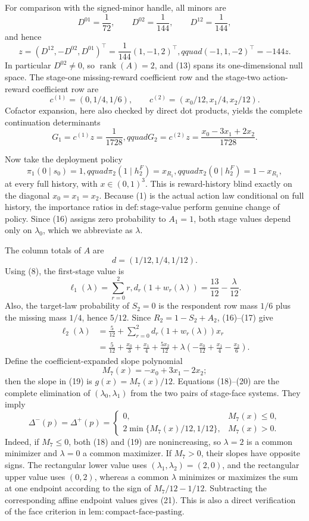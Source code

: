 For comparison with the signed-minor handle, all minors are
\[
D^{01}=\frac1{72},\qquad D^{02}=\frac1{144},\qquad
D^{12}=\frac1{144},
\tag{12}
\]
and hence
\[
z=(D^{12},-D^{02},D^{01})^\top
=\frac1{144}(1,-1,2)^\top,qquad
(-1,1,-2)^\top=-144z.
\tag{13}
\]
In particular \(D^{02}\ne0\), so \(\operatorname{rank}(A)=2\), and (13) spans its one-dimensional null space. The stage-one missing-reward coefficient row and the stage-two action-reward coefficient row are
\[
c^{(1)}=(0,1/4,1/6),
\qquad c^{(2)}=(x_0/12,x_1/4,x_2/12).
\tag{14}
\]
Cofactor expansion, here also checked by direct dot products, yields the complete continuation determinants
\[
G_1=c^{(1)}z=\frac1{1728},qquad
G_2=c^{(2)}z=\frac{x_0-3x_1+2x_2}{1728}.
\tag{15}
\]

Now take the deployment policy
\[
\pi_1(0\mid s_0)=1,qquad
\pi_2(1\mid h_2^F)=x_{R_1},qquad
\pi_2(0\mid h_2^F)=1-x_{R_1},
\tag{16}
\]
at every full history, with \(x\in(0,1)^3\). This is reward-history blind exactly on the diagonal \(x_0=x_1=x_2\). Because (1) is the actual action law conditional on full history, the importance ratios in \(\mathrm{def{:}stage\text{-}value}\) perform genuine change of policy. Since (16) assigns zero probability to \(A_1=1\), both stage values depend only on \(\lambda_0\), which we abbreviate as \(\lambda\).

The column totals of \(A\) are
\[
d=(1/12,1/4,1/12).
\tag{17}
\]
Using (8), the first-stage value is
\[
\ell_1(\lambda)=\sum_{r=0}^2r,d_r(1+w_r(\lambda))
=\frac{13}{12}-\frac{\lambda}{12}.
\tag{18}
\]
Also, the target-law probability of \(S_2=0\) is the respondent row mass \(1/6\) plus the missing mass \(1/4\), hence \(5/12\). Since \(R_2=1-S_2+A_2\), (16)--(17) give
\[
\begin{aligned}
\ell_2(\lambda)
&=\frac5{12}+\sum_{r=0}^2d_r(1+w_r(\lambda))x_r\\
&=\frac5{12}+\frac{x_0}{3}+\frac{x_1}{4}+\frac{5x_2}{12}
+\lambda\left(-\frac{x_0}{12}+\frac{x_1}{4}-\frac{x_2}{6}\right).
\end{aligned}
\tag{19}
\]
Define the coefficient-expanded slope polynomial
\[
M_7(x)=-x_0+3x_1-2x_2;
\tag{20}
\]
then the slope in (19) is \(g(x)=M_7(x)/12\). Equations (18)--(20) are the complete elimination of \((\lambda_0,\lambda_1)\) from the two pairs of stage-face systems. They imply
\[
\Delta^-(p)=\Delta^+(p)=
\begin{cases}
0,&M_7(x)\leq0,\\
2\min\{M_7(x)/12,1/12\},&M_7(x)>0.
\end{cases}
\tag{21}
\]
Indeed, if \(M_7\leq0\), both (18) and (19) are nonincreasing, so \(\lambda=2\) is a common minimizer and \(\lambda=0\) a common maximizer. If \(M_7>0\), their slopes have opposite signs. The rectangular lower value uses \((\lambda_1,\lambda_2)=(2,0)\), and the rectangular upper value uses \((0,2)\), whereas a common \(\lambda\) minimizes or maximizes the sum at one endpoint according to the sign of \(M_7/12-1/12\). Subtracting the corresponding affine endpoint values gives (21). This is also a direct verification of the face criterion in \(\mathrm{lem{:}compact\text{-}face\text{-}pasting}\).

